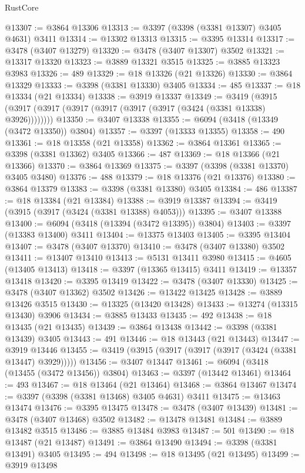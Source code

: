 \begin{lexlean}{RustCore}
\begin{coremodule}
@13307 := @3864 @13306
@13313 := @3397 (@3398 (@3381 @13307) @3405 @4631) @3411
@13314 := @13302 @13313
@13315 := @3395 @13314
@13317 := @3478 (@3407 @13279)
@13320 := @3478 (@3407 @13307) @3502
@13321 := @13317 @13320
@13323 := @3889 @13321 @3515
@13325 := @3885 @13323 @3983
@13326 := 489
@13329 := @18 @13326 (@21 @13326)
@13330 := @3864 @13329
@13333 := @3398 (@3381 @13330) @3405
@13334 := 485
@13337 := @18 @13334 (@21 @13334)
@13338 := @3919 @13337
@13349 := @3419 (@3915 (@3917 (@3917 (@3917 (@3917 (@3917 (@3917 (@3424 (@3381 @13338) @3926))))))))
@13350 := @3407 @13338
@13355 := @6094 (@3418 (@13349 (@3472 @13350)) @3804)
@13357 := @3397 (@13333 @13355)
@13358 := 490
@13361 := @18 @13358 (@21 @13358)
@13362 := @3864 @13361
@13365 := @3398 (@3381 @13362) @3405
@13366 := 487
@13369 := @18 @13366 (@21 @13366)
@13370 := @3864 @13369
@13375 := @3397 (@3398 (@3381 @13370) @3405 @3480)
@13376 := 488
@13379 := @18 @13376 (@21 @13376)
@13380 := @3864 @13379
@13383 := @3398 (@3381 @13380) @3405
@13384 := 486
@13387 := @18 @13384 (@21 @13384)
@13388 := @3919 @13387
@13394 := @3419 (@3915 (@3917 (@3424 (@3381 @13388) @4053)))
@13395 := @3407 @13388
@13400 := @6094 (@3418 (@13394 (@3472 @13395)) @3804)
@13403 := @3397 (@13383 @13400) @3411
@13404 := @13375 @13403
@13405 := @3395 @13404
@13407 := @3478 (@3407 @13370)
@13410 := @3478 (@3407 @13380) @3502
@13411 := @13407 @13410
@13413 := @5131 @13411 @3980
@13415 := @4605 (@13405 @13413)
@13418 := @3397 (@13365 @13415) @3411
@13419 := @13357 @13418
@13420 := @3395 @13419
@13422 := @3478 (@3407 @13330)
@13425 := @3478 (@3407 @13362) @3502
@13426 := @13422 @13425
@13428 := @3889 @13426 @3515
@13430 := @13325 (@13420 @13428)
@13433 := @13274 (@13315 @13430) @3906
@13434 := @3885 @13433
@13435 := 492
@13438 := @18 @13435 (@21 @13435)
@13439 := @3864 @13438
@13442 := @3398 (@3381 @13439) @3405
@13443 := 491
@13446 := @18 @13443 (@21 @13443)
@13447 := @3919 @13446
@13455 := @3419 (@3915 (@3917 (@3917 (@3917 (@3424 (@3381 @13447) @3929)))))
@13456 := @3407 @13447
@13461 := @6094 (@3418 (@13455 (@3472 @13456)) @3804)
@13463 := @3397 (@13442 @13461)
@13464 := 493
@13467 := @18 @13464 (@21 @13464)
@13468 := @3864 @13467
@13474 := @3397 (@3398 (@3381 @13468) @3405 @4631) @3411
@13475 := @13463 @13474
@13476 := @3395 @13475
@13478 := @3478 (@3407 @13439)
@13481 := @3478 (@3407 @13468) @3502
@13482 := @13478 @13481
@13484 := @3889 @13482 @3515
@13486 := @3885 @13484 @3983
@13487 := 501
@13490 := @18 @13487 (@21 @13487)
@13491 := @3864 @13490
@13494 := @3398 (@3381 @13491) @3405
@13495 := 494
@13498 := @18 @13495 (@21 @13495)
@13499 := @3919 @13498

\end{coremodule}
\end{lexlean}
